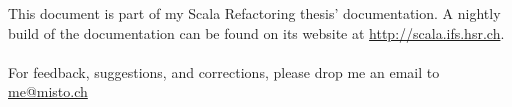 \documentclass[10pt,a4paper,oneside]{scrreprt}
\begin{document}
\newcommand{\subtitlename}{}
\newcommand{\titlename}{Scala Abstract Syntax Trees} 



\vspace*{\fill}
 
\noindent This document is part of my Scala Refactoring thesis' documentation. A nightly build of the documentation can be found on its website at \url{http://scala.ifs.hsr.ch}.
\\\\
For feedback, suggestions, and corrections, please drop me an email to \href{mailto:me@misto.ch}{me@misto.ch}

\vspace*{\fill}

\setcounter{secnumdepth}{-1}



\end{document}
